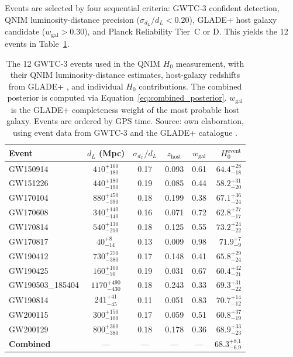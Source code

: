 \documentclass[11pt,a4paper, english]{book}
\theoremstyle{plain}
\theoremstyle{definition}
\numberwithin{equation}{chapter}
\numberwithin{figure}{chapter}
\numberwithin{table}{chapter}
\begin{document}
Events are selected by four sequential criteria: GWTC-3 confident detection, QNIM luminosity-distance precision ($\sigma_{d_L}/d_L < 0.20$), GLADE+ host galaxy candidate ($w_\mathrm{gal} > 0.30$), and Planck Reliability Tier~C or D.  This yields the 12 events in Table~\ref{tab:h0-events}.

\begin{table}[ht]
\centering

\small
\begin{tabular}{@{}lccccr@{}}
\toprule
\textbf{Event} &
$d_L$ (Mpc) &
$\sigma_{d_L}/d_L$ &
$z_\mathrm{host}$ &
$w_\mathrm{gal}$ &
$H_0^\mathrm{event}$ \\
\midrule
GW150914  & $410^{+160}_{-180}$  & 0.17 & 0.093 & 0.61 & $64.4^{+28}_{-18}$ \\
GW151226  & $440^{+180}_{-190}$  & 0.19 & 0.085 & 0.44 & $58.2^{+31}_{-20}$ \\
GW170104  & $880^{+450}_{-390}$  & 0.18 & 0.199 & 0.38 & $67.1^{+36}_{-24}$ \\
GW170608  & $340^{+140}_{-140}$  & 0.16 & 0.071 & 0.72 & $62.8^{+27}_{-17}$ \\
GW170814  & $540^{+130}_{-210}$  & 0.18 & 0.125 & 0.55 & $73.2^{+24}_{-22}$ \\
GW170817  & $40^{+8}_{-14}$      & 0.13 & 0.009 & 0.98 & $71.9^{+7}_{-9}$   \\
GW190412  & $730^{+270}_{-380}$  & 0.17 & 0.148 & 0.41 & $65.8^{+29}_{-24}$ \\
GW190425  & $160^{+100}_{-70}$   & 0.19 & 0.031 & 0.67 & $60.4^{+42}_{-21}$ \\
GW190503\_185404  & $1170^{+490}_{-430}$ & 0.18 & 0.243 & 0.33 & $69.3^{+31}_{-22}$ \\
GW190814  & $241^{+41}_{-45}$    & 0.11 & 0.051 & 0.83 & $70.7^{+14}_{-12}$ \\
GW200115  & $300^{+150}_{-100}$  & 0.17 & 0.059 & 0.51 & $60.8^{+37}_{-19}$ \\
GW200129  & $800^{+360}_{-380}$  & 0.18 & 0.178 & 0.36 & $68.9^{+33}_{-23}$ \\
\midrule
\textbf{Combined} & --- & --- & --- & --- &
  $\mathbf{68.3^{+8.1}_{-6.9}}$ \\
\bottomrule
\end{tabular}
\caption[GWTC-3 events for QNIM]{The 12 GWTC-3 events used in the QNIM $H_0$ measurement,
         with their QNIM luminosity-distance estimates, host-galaxy
         redshifts from GLADE+ \cite{Dalya_2022}, and
         individual $H_0$ contributions. The combined posterior
         is computed via Equation~\eqref{eq:combined_posterior}.
         $w_\mathrm{gal}$ is the GLADE+ completeness weight of the
         most probable host galaxy. Events are ordered by GPS time. Source: own elaboration, using event data from GWTC-3 \cite{GWTC3_2023} and the GLADE+ catalogue \cite{Dalya_2022}.}
\label{tab:h0-events}
\vspace{2pt}
\normalsize

\end{table}
\end{document}

